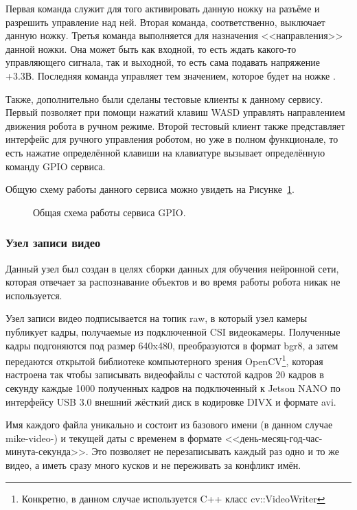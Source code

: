 Первая команда служит для того активировать данную ножку на разъёме и разрешить управление над ней. Вторая команда, соответственно, выключает данную ножку. Третья команда выполняется для назначения <<направления>> данной ножки. Она может быть как входной, то есть ждать какого-то управляющего сигнала, так и выходной, то есть сама подавать напряжение +3.3В. Последняя команда управляет тем значением, которое будет на ножке .

Также, дополнительно были сделаны тестовые клиенты к данному сервису. Первый позволяет при помощи нажатий клавиш WASD управлять направлением движения робота в ручном режиме. Второй тестовый клиент также представляет интерфейс для ручного управления роботом, но уже в полном функционале, то есть нажатие определённой клавиши на клавиатуре вызывает определённую команду GPIO сервиса.

Общую схему работы данного сервиса можно увидеть на Рисунке~\ref{fig:service-gpio}.

\begin{figure}[ht]
  \caption{Общая схема работы сервиса GPIO.}\label{fig:service-gpio}
\end{figure}

\subsubsection{Узел записи видео}
Данный узел был создан в целях сборки данных для обучения нейронной сети, которая отвечает за распознавание объектов и во время работы робота никак не используется. 

Узел записи видео подписывается на топик raw, в который узел камеры публикует кадры, получаемые из подключенной CSI видеокамеры. Полученные кадры подгоняются под размер 640x480, преобразуются в формат bgr8, а затем передаются открытой библиотеке компьютерного зрения OpenCV\footnote{Конкретно, в данном случае используется C++ класс cv::VideoWriter}, которая настроена так чтобы записывать видеофайлы с частотой кадров 20 кадров в секунду каждые 1000 полученных кадров на подключенный к Jetson NANO по интерфейсу USB 3.0 внешний жёсткий диск в кодировке DIVX и формате avi. 

Имя каждого файла уникально и состоит из базового имени (в данном случае mike-video-) и текущей даты с временем в формате <<день-месяц-год-час-минута-секунда>>. Это позволяет не перезаписывать каждый раз одно и то же видео, а иметь сразу много кусков и не переживать за конфликт имён. 


